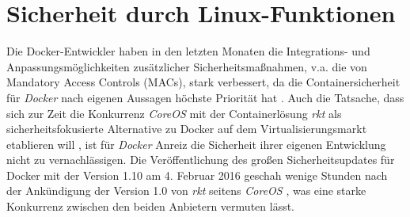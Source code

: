 \documentclass[../main.tex]{subfiles}
\begin{document}









\chapter{Sicherheit durch Linux-Funktionen}
\label{secLinux}
	Die Docker-Entwickler haben in den letzten Monaten die Integrations- und Anpassungsmöglichkeiten zusätzlicher Sicherheitsmaßnahmen, v.a. die von Mandatory Access Controls (MACs), stark verbessert, da die Containersicherheit für \emph{Docker} nach eigenen Aussagen höchste Priorität hat \cite{githubDockerRoadmap}\cite{githubDockerChangelog}. Auch die Tatsache, dass sich zur Zeit die Konkurrenz \emph{CoreOS} mit der Containerlösung \emph{rkt} als sicherheitsfokusierte Alternative zu Docker auf dem Virtualisierungsmarkt etablieren will \cite{coreosAnnouncementRkt10}, ist für \emph{Docker} Anreiz die Sicherheit ihrer eigenen Entwicklung nicht zu vernachlässigen. Die Veröffentlichung des großen Sicherheitsupdates für Docker mit der Version 1.10 am 4. Februar 2016 geschah wenige Stunden nach der Ankündigung der Version 1.0 von \emph{rkt} seitens \emph{CoreOS} \cite{hnAnnouncementDocker110}\cite{hnAnnouncementRkt10}, was eine starke Konkurrenz zwischen den beiden Anbietern vermuten lässt. %
\end{document}
